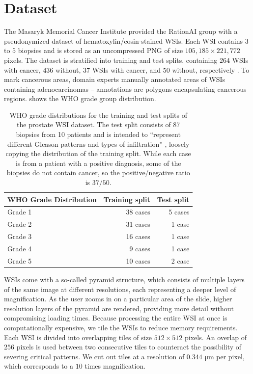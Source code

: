 \section{Dataset}\label{sec:dataset}

The Masaryk Memorial Cancer Institute provided the RationAI group with a pseudonymized dataset of hematoxylin/eosin-stained WSIs.
Each WSI contains $3$ to $5$ biopsies and is stored as an uncompressed PNG of size $105,185 \times 221,772$ pixels.
The dataset is stratified into training and test splits, containing $264$ WSIs with cancer, $436$ without, $37$ WSIs with cancer, and $50$ without, respectively \cite{gallo}.
To mark cancerous areas, domain experts manually annotated areas of WSIs containing adenocarcinomas -- annotations are polygons encapsulating cancerous regions.
 shows the WHO grade group distribution.

\begin{table}
\centering
{}
\begin{tabular}{@{} l r r @{}}\toprule
WHO Grade Distribution & Training split & Test split \\ 
\midrule
Grade 1         & 38 cases            & 5 cases      \\
Grade 2         & 31 cases            & 1 case       \\
Grade 3         & 16 cases            & 1 case       \\
Grade 4         & 9 cases             & 1 case       \\
Grade 5         & 10 cases            & 2 case       \\
\bottomrule
\end{tabular}
\caption{WHO grade distributions for the training and test splits of the prostate WSI dataset. The test split consists of $87$ biopsies from 10 patients and is intended to ``represent different Gleason patterns
and types of infiltration'' \cite{gallo}, loosely copying the distribution of the training split. While each case is from a patient with a positive diagnosis, some of the biopsies do not contain cancer, so the positive/negative ratio is $37/50$.}
\label{tab:who_grade_distribution}
\end{table}

WSIs come with a so-called pyramid structure, which consists of multiple layers of the same image at different resolutions, each representing a deeper level of magnification.
As the user zooms in on a particular area of the slide, higher resolution layers of the pyramid are rendered, providing more detail without compromising loading times.
Because processing the entire WSI at once is computationally expensive, we tile the WSIs to reduce memory requirements.
Each WSI is divided into overlapping tiles of size $512 \times 512$ pixels.
An overlap of $256$ pixels is used between two consecutive tiles to counteract the possibility of severing critical patterns.
We cut out tiles at a resolution of $0.344$ \si{\micro\meter} per pixel, which corresponds to a $10$ times magnification.

